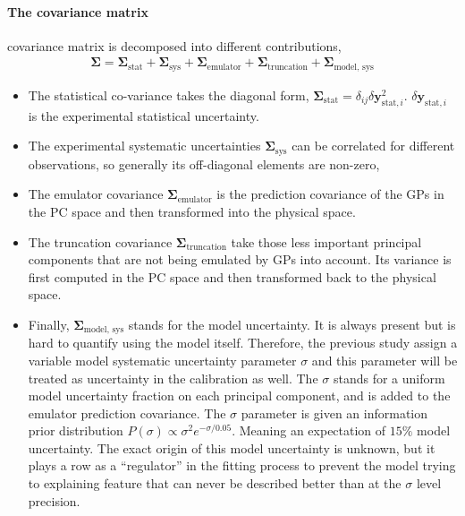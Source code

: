 \paragraph{The covariance matrix} covariance matrix is decomposed into different contributions,
\begin{eqnarray}
\mathbf{\Sigma} = \mathbf{\Sigma}_{\textrm{stat}} + \mathbf{\Sigma}_{\textrm{sys}} + \mathbf{\Sigma}_{\textrm{emulator}} + \mathbf{\Sigma}_{\textrm{truncation}} + \mathbf{\Sigma}_{\textrm{model, sys}}
\end{eqnarray}
\begin{itemize}
\item The statistical co-variance takes the diagonal form, $\mathbf{\Sigma}_{\textrm{stat}} = \delta_{ij}\delta\mathbf{y}_{\textrm{stat}, i}^2$. 
$\delta\mathbf{y}_{\textrm{stat}, i}$ is the experimental statistical uncertainty.
\item The experimental systematic uncertainties $\mathbf{\Sigma}_{\textrm{sys}}$ can be correlated for different observations, so generally its off-diagonal elements are non-zero,
\item The emulator covariance $\mathbf{\Sigma}_{\textrm{emulator}}$ is the prediction covariance of the GPs in the PC space and then transformed into the physical space.
\item The truncation covariance $\mathbf{\Sigma}_{\textrm{truncation}}$ take those less important principal components that are not being emulated by GPs into account. 
Its variance is first computed in the PC space and then transformed back to the physical space.
\item Finally, $\mathbf{\Sigma}_{\textrm{model, sys}}$ stands for the model uncertainty. 
It is always present but is hard to quantify using the model itself.
Therefore, the previous study \cite{Bernhard:2018hnz} assign a variable model systematic uncertainty parameter $\sigma$ and this parameter will be treated as uncertainty in the calibration as well.
The $\sigma$ stands for a uniform model uncertainty fraction on each principal component, and is added to the emulator prediction covariance.
The $\sigma$ parameter is given an information prior distribution $P(\sigma) \propto \sigma^2 e^{-\sigma/0.05}$. Meaning an expectation of $15\%$ model uncertainty.
The exact origin of this model uncertainty is unknown, but it plays a row as a ``regulator'' in the fitting process to prevent the model trying to explaining feature that can never be described better than at the $\sigma$ level precision.
\end{itemize}

